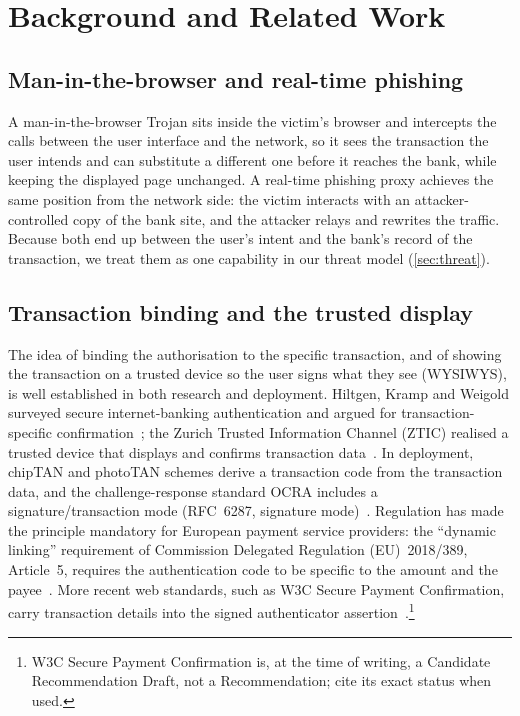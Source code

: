 \section{Background and Related Work}\label{sec:background}

\subsection{Man-in-the-browser and real-time phishing}
A man-in-the-browser Trojan sits inside the victim's browser and intercepts the
calls between the user interface and the network, so it sees the transaction the
user intends and can substitute a different one before it reaches the bank,
while keeping the displayed page unchanged. A real-time phishing proxy achieves
the same position from the network side: the victim interacts with an
attacker-controlled copy of the bank site, and the attacker relays and rewrites
the traffic. Because both end up between the user's intent and the bank's record
of the transaction, we treat them as one capability in our threat model
(\cref{sec:threat}).

\subsection{Transaction binding and the trusted display}
The idea of binding the authorisation to the specific transaction, and of
showing the transaction on a trusted device so the user signs what they see
(WYSIWYS), is well established in both research and deployment. Hiltgen,
Kramp and Weigold surveyed secure internet-banking authentication and argued for
transaction-specific confirmation~\cite{hiltgen2006}; the Zurich Trusted
Information Channel (ZTIC) realised a trusted device that displays and confirms
transaction data~\cite{ztic2008}. In deployment, chipTAN and photoTAN schemes
derive a transaction code from the transaction data, and the challenge-response
standard OCRA includes a signature/transaction mode (RFC~6287, signature
mode)~\cite{rfc6287}. Regulation has made the principle mandatory for European
payment service providers: the ``dynamic linking'' requirement of Commission
Delegated Regulation (EU)~2018/389, Article~5, requires the authentication code
to be specific to the amount and the payee~\cite{eu2018389}. More recent web
standards, such as W3C Secure Payment Confirmation, carry transaction details
into the signed authenticator assertion~\cite{w3cspc}.\footnote{W3C Secure
Payment Confirmation is, at the time of writing, a Candidate Recommendation
Draft, not a Recommendation; cite its exact status when used.}

